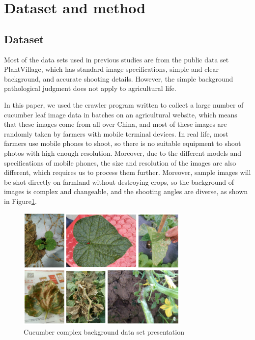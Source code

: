 \documentclass[a4paper,fleqn]{cas-sc}
\begin{document}
\section{Dataset and method}

\subsection{Dataset}
Most of the data sets used in previous studies are from the public data set PlantVillage, which has standard image specifications, simple and clear background, and accurate shooting details. However, the simple background pathological judgment does not apply to agricultural life.

In this paper, we used the crawler program written to collect a large number of cucumber leaf image data in batches on an agricultural website, which means that these images come from all over China, and most of these images are randomly taken by farmers with mobile terminal devices. In real life, most farmers use mobile phones to shoot, so there is no suitable equipment to shoot photos with high enough resolution. Moreover, due to the different models and specifications of mobile phones, the size and resolution of the images are also different, which requires us to process them further. Moreover, sample images will be shot directly on farmland without destroying crops, so the background of images is complex and changeable, and the shooting angles are diverse, as shown in Figure\ref{fig:f1}.
\begin{figure}
\centering
\includegraphics[width=0.75\textwidth]{figs_rev1/f1.png}
\caption{Cucumber complex background data set presentation}
\label{fig:f1}
\end{figure}
\end{document}
